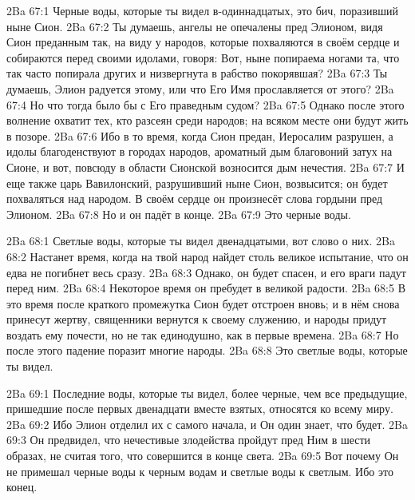 \vs 2Ba 67:1
Черные воды, которые ты видел в-одиннадцатых, это бич, поразивший ныне Сион.
\vs 2Ba 67:2
Ты думаешь, ангелы не опечалены пред Элионом, видя Сион преданным так, на виду у народов, которые похваляются в своём сердце и собираются перед своими идолами, говоря: Вот, ныне попираема ногами та, что так часто попирала других и низвергнута в рабство покорявшая?
\vs 2Ba 67:3
Ты думаешь, Элион радуется этому, или что Его Имя прославляется от этого?
\vs 2Ba 67:4
Но что тогда было бы с Его праведным судом?
\vs 2Ba 67:5
Однако после этого волнение охватит тех, кто разсеян среди народов; на всяком месте они будут жить в позоре.
\vs 2Ba 67:6
Ибо в то время, когда Сион предан, Иеросалим разрушен, а идолы благоденствуют в городах народов, ароматный дым благовоний затух на Сионе, и вот, повсюду в области Сионской возносится дым нечестия.
\vs 2Ba 67:7
И еще также царь Вавилонский, разрушивший ныне Сион, возвысится; он будет похваляться над народом. В своём сердце он произнесёт слова гордыни пред Элионом.
\vs 2Ba 67:8
Но и он падёт в конце.
\vs 2Ba 67:9
Это черные воды.

\vs 2Ba 68:1
Светлые воды, которые ты видел двенадцатыми, вот слово о них.
\vs 2Ba 68:2
Настанет время, когда на твой народ найдет столь великое испытание, что он едва не погибнет весь сразу.
\vs 2Ba 68:3
Однако, он будет спасен, и его враги падут перед ним.
\vs 2Ba 68:4
Некоторое время он пребудет в великой радости.
\vs 2Ba 68:5
В это время после краткого промежутка Сион будет отстроен вновь; и в нём снова принесут жертву, священники вернутся к своему служению, и народы придут воздать ему почести, но не так единодушно, как в первые времена.
\vs 2Ba 68:7
Но после этого падение поразит многие народы.
\vs 2Ba 68:8
Это светлые воды, которые ты видел.

\vs 2Ba 69:1
Последние воды, которые ты видел, более черные, чем все предыдущие, пришедшие после первых двенадцати вместе взятых, относятся ко всему миру.
\vs 2Ba 69:2
Ибо Элион отделил их с самого начала, и Он один знает, что будет.
\vs 2Ba 69:3
Он предвидел, что нечестивые злодейства пройдут пред Ним в шести образах, не считая того, что совершится в конце света.
\vs 2Ba 69:5
Вот почему Он не примешал черные воды к черным водам и светлые воды к светлым. Ибо это конец.


